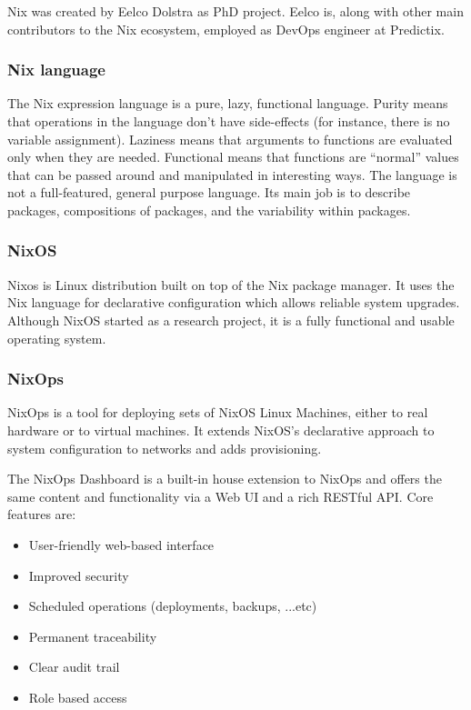 Nix was created by Eelco Dolstra as PhD project. Eelco is, along with other main
contributors to the Nix ecosystem, employed as DevOps engineer at Predictix.
\subsubsection{Nix language}
The Nix expression language is a pure, lazy, functional language. Purity means
that operations in the language don't have side-effects (for instance, there is
no variable assignment). Laziness means that arguments to functions are
evaluated only when they are needed. Functional means that functions are
“normal” values that can be passed around and manipulated in interesting ways.
The language is not a full-featured, general purpose language. Its main job is
to describe packages, compositions of packages, and the variability within
packages.

\subsubsection{NixOS}
Nixos is Linux distribution built on top of the Nix package manager. It
uses the Nix language for declarative configuration which allows reliable
system upgrades.
Although NixOS started as a research project, it is a fully functional and
usable operating system.

\subsubsection{NixOps}
NixOps is a tool for deploying sets of NixOS Linux Machines, either to real
hardware or to virtual machines. It extends NixOS's declarative approach to
system configuration to networks and adds provisioning.

\par
The NixOps Dashboard is a built-in house extension to NixOps and offers the same
content and functionality via a Web UI and a rich RESTful API. Core features
are:

\begin{itemize}
\item User-friendly web-based interface
\item Improved security
\item Scheduled operations (deployments, backups, ...etc)
\item Permanent traceability
\item Clear audit trail
\item Role based access
\end{itemize}

